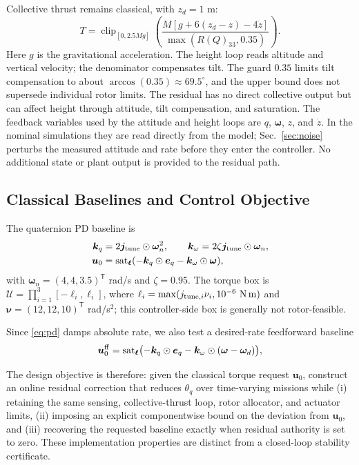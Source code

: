 \documentclass[letterpaper, 10 pt, conference]{ieeeconf}
\newcommand{\T}{^{\mathsf T}}
\newcommand{\sat}{\operatorname{sat}}
\newcommand{\clip}{\operatorname{clip}}
\begin{document}
Collective thrust remains classical, with $z_d=1$ m:
\begin{equation}
 T=\clip_{[0,2.5Mg]}
 \left(\frac{M[g+6(z_d-z)-4\dot z]}{\max(R(Q)_{33},0.35)}\right).
 \label{eq:collective}
\end{equation}
Here $g$ is the gravitational acceleration. The height loop reads altitude and vertical velocity; the denominator compensates tilt.
The guard $0.35$ limits tilt compensation to about $\arccos(0.35)\approx69.5^\circ$, and the upper bound does
not supersede individual rotor limits. The residual has no direct collective
output but can affect height through attitude, tilt compensation, and
saturation.
The feedback variables used by the attitude and height loops are $q$, $\bm\omega$, $z$, and $\dot z$. In the nominal simulations they are read directly from the model; Sec.~\ref{sec:noise} perturbs the measured attitude and rate before they enter the controller. No additional state or plant output is provided to the residual path.

\subsection{Classical Baselines and Control Objective}

The quaternion PD baseline is
\begin{align}
 \bm k_q&=2\bm j_{\rm tune}\odot\bm\omega_n^2,\qquad
 \bm k_\omega=2\zeta\bm j_{\rm tune}\odot\bm\omega_n,\\
 \bm u_0&=\sat_{\bm\ell}(-\bm k_q\odot\bm e_q-\bm k_\omega\odot\bm\omega),
 \label{eq:pd}
\end{align}
with $\bm\omega_n=(4,4,3.5)\T$ rad/s and $\zeta=0.95$. The torque box is
$\mathcal U=\prod_{i=1}^3[-\ell_i,\ell_i]$, where
$\ell_i=\max(j_{{\rm tune},i}\nu_i,10^{-6}\ \mathrm{N\,m})$ and
$\bm\nu=(12,12,10)\T$ rad/s$^2$; this controller-side box is generally not rotor-feasible.

Since \eqref{eq:pd} damps absolute rate, we also test a desired-rate feedforward baseline
\begin{equation}
 \bm u_0^{\rm ff}=\sat_{\bm\ell}\bigl(-\bm k_q\odot\bm e_q-\bm k_\omega\odot(\bm\omega-\bm\omega_d)\bigr),
 \label{eq:pdff}
\end{equation}

The design objective is therefore: given the classical torque request $\bm u_0$, construct an online residual correction that reduces $\theta_q$ over time-varying missions while (i) retaining the same sensing, collective-thrust loop, rotor allocator, and actuator limits, (ii) imposing an explicit componentwise bound on the deviation from $\bm u_0$, and (iii) recovering the requested baseline exactly when residual authority is set to zero. These implementation properties are distinct from a closed-loop stability certificate.
\end{document}
